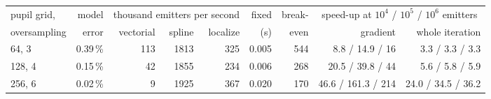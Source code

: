 \begin{tabular}{lrrrrrrrr}\toprule
pupil grid, & model & \multicolumn{3}{c}{thousand emitters per second} & fixed & break- & \multicolumn{2}{c}{speed-up at $10^4$ / $10^5$ / $10^6$ emitters}\\
oversampling & error & vectorial & spline & localize & (s) & even & gradient & whole iteration\\ \midrule
64, 3 & 0.39\,\% & 113 & 1813 & 325 & 0.005 & 544 & 8.8 / 14.9 / 16 & 3.3 / 3.3 / 3.3\\
128, 4 & 0.15\,\% & 42 & 1855 & 234 & 0.006 & 268 & 20.5 / 39.8 / 44 & 5.6 / 5.8 / 5.9\\
256, 6 & 0.02\,\% & 9 & 1925 & 367 & 0.020 & 170 & 46.6 / 161.3 / 214 & 24.0 / 34.5 / 36.2\\
\bottomrule\end{tabular}